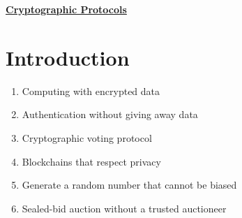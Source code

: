\documentclass{report}
\begin{document}
 \begin{center}
 \huge{\textbf{\underline{Cryptographic Protocols}}}
 \end{center}
 
 {\let\clearpage\relax \chapter{Introduction}}
 \begin{enumerate}[-]
 	\item Computing with encrypted data
 	\item Authentication without giving away data
 	\item Cryptographic voting protocol
 	\item Blockchains that respect privacy
 	\item Generate a random number that cannot be biased
 	\item Sealed-bid auction without a trusted auctioneer
 \end{enumerate}
 
\end{document}
